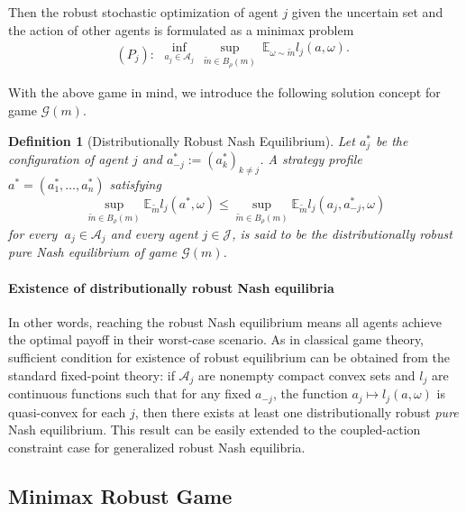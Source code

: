 \documentclass{article}
\newtheorem{defi}{Definition}
\begin{document}
Then the robust stochastic optimization of agent $j$ given the uncertain set and the action of other agents is formulated as a minimax problem
\begin{equation}(P_j):
\begin{array}{l}
\inf_{a_j\in \mathcal{A}_j} \ \sup_{\tilde{m}\in B_{\rho}(m)}\ \mathbb{E}_{\omega \sim \tilde{m}} l_j(a,\omega).
\end{array}
\end{equation}

With the above game in mind, we introduce the following solution concept for game $\mathcal{G}(m)$.
\begin{defi}[Distributionally Robust Nash Equilibrium]
Let $a^*_j$ be the configuration of agent $j$ and $a^*_{-j}:=(a^*_k)_{k\neq j}$.
A strategy profile $a^*=(a^*_1,\ldots,a^*_n)$ satisfying
\begin{equation*}
\sup_{\tilde{m}\in B_{\rho}(m)}\mathbb{E}_{\tilde{m}} l_j(a^*,\omega)\leq \sup_{\tilde{m}\in B_{\rho}(m)}\mathbb{E}_{\tilde{m}} l_j(a_j,a^*_{-j},\omega)
\end{equation*}
for every $\ a_j\in\mathcal{A}_j$ and every agent $j \in \mathcal{J}$, is said to be the \emph{distributionally robust pure Nash equilibrium} of game $\mathcal{G}(m)$.
\end{defi}

\paragraph{Existence of distributionally robust Nash equilibria} In other words, reaching the robust Nash equilibrium means all agents achieve the optimal payoff in their worst-case scenario. As in classical game theory, sufficient condition for existence of robust equilibrium can be obtained from the standard fixed-point theory: if $\mathcal{A}_j$ are nonempty compact convex sets and $l_j$ are continuous functions such that for any fixed $a_{-j}$, the function $a_j \mapsto l_j(a,\omega)$ is quasi-convex for each $j$, then there exists at least one distributionally robust {\it pure} Nash equilibrium. This result can be easily extended to the coupled-action constraint case for generalized robust Nash equilibria.


\subsection{Minimax Robust Game}
\end{document}
